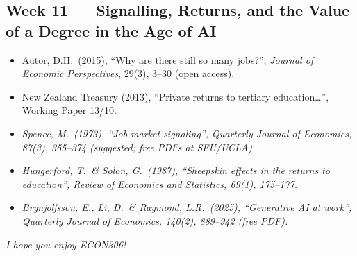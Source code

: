 \documentclass[11pt, a4paper]{article}
\begin{document}
\subsection{Week 11 — Signalling, Returns, and the Value of a Degree in the Age of AI}
\begin{itemize}
  \item Autor, D.H.\ (2015), ``Why are there still so many jobs?'', \textit{Journal of Economic Perspectives}, 29(3), 3--30 (open access).
  \item New Zealand Treasury (2013), ``Private returns to tertiary education…'', Working Paper 13/10.
  \item \emph{Spence, M.\ (1973), ``Job market signaling'', \textit{Quarterly Journal of Economics}, 87(3), 355--374 (suggested; free PDFs at SFU/UCLA).}
  \item \emph{Hungerford, T.\ \& Solon, G.\ (1987), ``Sheepskin effects in the returns to education'', \textit{Review of Economics and Statistics}, 69(1), 175--177.}
  \item \emph{Brynjolfsson, E., Li, D.\ \& Raymond, L.R.\ (2025), ``Generative AI at work'', \textit{Quarterly Journal of Economics}, 140(2), 889--942 (free PDF).}
\end{itemize}

\vspace{1em}
\begin{center}
\textit{I hope you enjoy ECON306!}
\end{center}
\end{document}
